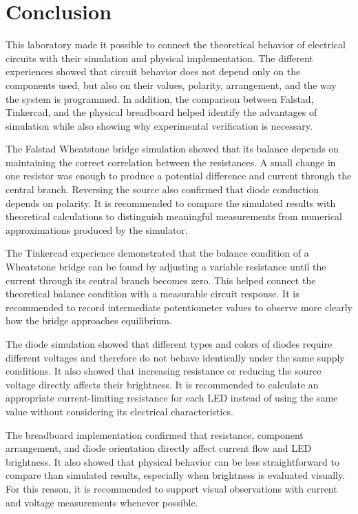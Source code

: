 
\section*{Conclusion}

This laboratory made it possible to connect the theoretical behavior of electrical circuits with their simulation and physical implementation. The different experiences showed that circuit behavior does not depend only on the components used, but also on their values, polarity, arrangement, and the way the system is programmed. In addition, the comparison between Falstad, Tinkercad, and the physical breadboard helped identify the advantages of simulation while also showing why experimental verification is necessary.

The Falstad Wheatstone bridge simulation showed that its balance depends on maintaining the correct correlation between the resistances. A small change in one resistor was enough to produce a potential difference and current through the central branch. Reversing the source also confirmed that diode conduction depends on polarity. It is recommended to compare the simulated results with theoretical calculations to distinguish meaningful measurements from numerical approximations produced by the simulator.

The Tinkercad experience demonstrated that the balance condition of a Wheatstone bridge can be found by adjusting a variable resistance until the current through its central branch becomes zero. This helped connect the theoretical balance condition with a measurable circuit response. It is recommended to record intermediate potentiometer values to observe more clearly how the bridge approaches equilibrium.

The diode simulation showed that different types and colors of diodes require different voltages and therefore do not behave identically under the same supply conditions. It also showed that increasing resistance or reducing the source voltage directly affects their brightness. It is recommended to calculate an appropriate current-limiting resistance for each LED instead of using the same value without considering its electrical characteristics.

The breadboard implementation confirmed that resistance, component arrangement, and diode orientation directly affect current flow and LED brightness. It also showed that physical behavior can be less straightforward to compare than simulated results, especially when brightness is evaluated visually. For this reason, it is recommended to support visual observations with current and voltage measurements whenever possible.


